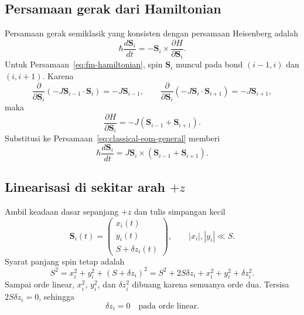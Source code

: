 \documentclass[11pt,a4paper]{article}
\newcommand{\vS}{\bm S}
\begin{document}
\subsection{Persamaan gerak dari Hamiltonian}

Persamaan gerak semiklasik yang konsisten dengan persamaan Heisenberg adalah
\begin{equation}
\hbar\frac{d\vS_i}{dt}
=-\vS_i\times\frac{\partial H}{\partial\vS_i}.
\label{eq:classical-eom-general}
\end{equation}
Untuk Persamaan~\eqref{eq:fm-hamiltonian}, spin $\vS_i$ muncul pada bond $(i-1,i)$ dan $(i,i+1)$. Karena
\begin{equation}
\frac{\partial}{\partial\vS_i}\left(-J\vS_{i-1}\cdot\vS_i\right)=-J\vS_{i-1},
\qquad
\frac{\partial}{\partial\vS_i}\left(-J\vS_i\cdot\vS_{i+1}\right)=-J\vS_{i+1},
\end{equation}
maka
\begin{equation}
\frac{\partial H}{\partial\vS_i}
=-J(\vS_{i-1}+\vS_{i+1}).
\end{equation}
Substitusi ke Persamaan~\eqref{eq:classical-eom-general} memberi
\begin{equation}
\boxed{
\hbar\frac{d\vS_i}{dt}
=J\vS_i\times(\vS_{i-1}+\vS_{i+1}).}
\label{eq:fm-vector-eom}
\end{equation}

\subsection{Linearisasi di sekitar arah \texorpdfstring{$+z$}{+z}}

Ambil keadaan dasar sepanjang $+z$ dan tulis simpangan kecil
\begin{equation}
\vS_i(t)=
\begin{pmatrix}
x_i(t)\\y_i(t)\\S+\delta z_i(t)
\end{pmatrix},
\qquad |x_i|,|y_i|\ll S.
\end{equation}
Syarat panjang spin tetap adalah
\begin{equation}
S^2=x_i^2+y_i^2+(S+\delta z_i)^2
=S^2+2S\delta z_i+x_i^2+y_i^2+\delta z_i^2.
\end{equation}
Sampai orde linear, $x_i^2$, $y_i^2$, dan $\delta z_i^2$ dibuang karena semuanya orde dua. Tersisa $2S\delta z_i=0$, sehingga
\begin{equation}
\delta z_i=0\quad\text{pada orde linear}.
\end{equation}
\end{document}
